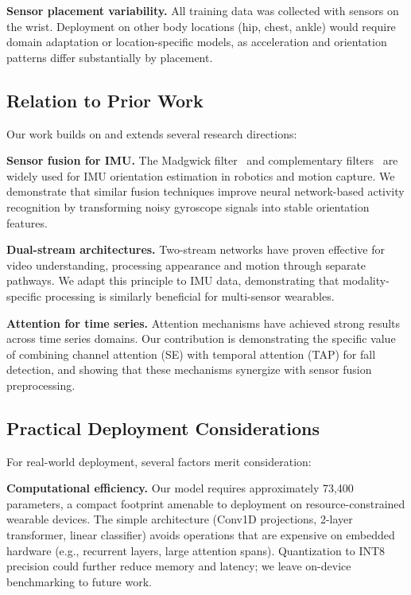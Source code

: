 \textbf{Sensor placement variability.} All training data was collected with sensors on the wrist. Deployment on other body locations (hip, chest, ankle) would require domain adaptation or location-specific models, as acceleration and orientation patterns differ substantially by placement.

\subsection{Relation to Prior Work}
\label{subsec:related}

Our work builds on and extends several research directions:

\textbf{Sensor fusion for IMU.} The Madgwick filter~\cite{madgwick2010efficient} and complementary filters~\cite{sabatini2011estimating} are widely used for IMU orientation estimation in robotics and motion capture. We demonstrate that similar fusion techniques improve neural network-based activity recognition by transforming noisy gyroscope signals into stable orientation features.

\textbf{Dual-stream architectures.} Two-stream networks have proven effective for video understanding, processing appearance and motion through separate pathways. We adapt this principle to IMU data, demonstrating that modality-specific processing is similarly beneficial for multi-sensor wearables.

\textbf{Attention for time series.} Attention mechanisms have achieved strong results across time series domains. Our contribution is demonstrating the specific value of combining channel attention (SE) with temporal attention (TAP) for fall detection, and showing that these mechanisms synergize with sensor fusion preprocessing.

\subsection{Practical Deployment Considerations}
\label{subsec:deployment}

For real-world deployment, several factors merit consideration:

\textbf{Computational efficiency.} Our model requires approximately 73,400 parameters, a compact footprint amenable to deployment on resource-constrained wearable devices. The simple architecture (Conv1D projections, 2-layer transformer, linear classifier) avoids operations that are expensive on embedded hardware (e.g., recurrent layers, large attention spans). Quantization to INT8 precision could further reduce memory and latency; we leave on-device benchmarking to future work.

